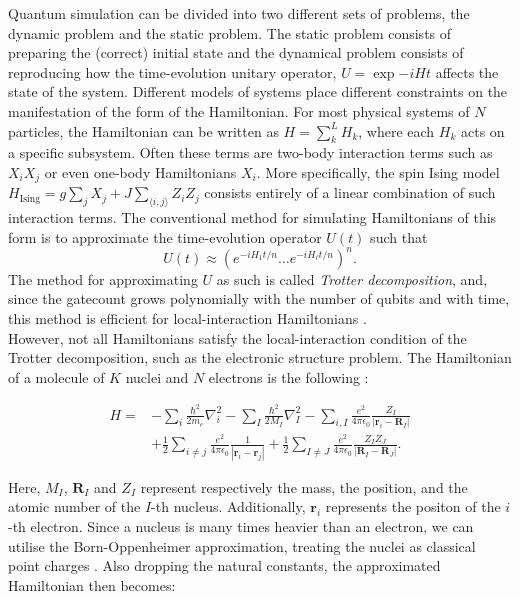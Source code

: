 Quantum simulation can be divided into two different sets of problems, the dynamic problem and the static problem. The static problem consists of preparing the (correct) initial state and the dynamical problem consists of reproducing how the time-evolution unitary operator, $U= \exp{-iHt}$ affects the state of the system. Different models of systems place different constraints on the manifestation of the form of the Hamiltonian. For most physical systems of $N$ particles, the Hamiltonian can be written as
$H = \sum_k^L H_k$, where each $H_k$ acts on a specific subsystem. Often these terms are two-body interaction terms such as $X_i X_j$ or even one-body Hamiltonians $X_i$. More specifically, the spin Ising model $
H_{\mathrm{Ising}}=g \sum_{j} X_{j}+J \sum_{\langle i, j\rangle} Z_{i} Z_j
$ consists entirely of a linear combination of such interaction terms. The conventional method for simulating Hamiltonians of this form is to approximate the time-evolution operator $U(t)$ such that  $$U(t) \approx\left(e^{-i H_{1} t / n} \ldots e^{-i H_{\ell} t / n}\right)^{n}.$$ The method for approximating $U$ as such is called \textit{Trotter decomposition}, and, since the gatecount grows polynomially with the number of qubits and with time, this method is efficient for
local-interaction Hamiltonians \cite{cao}. \\
However, not all Hamiltonians satisfy the local-interaction condition of the Trotter decomposition, such as the electronic structure problem. The Hamiltonian of a molecule of $K$ nuclei and $N$ electrons is the following \cite{McArdle}:

$$
\begin{aligned}
H=&-\sum_{i} \frac{\hbar^{2}}{2 m_{e}} \nabla_{i}^{2}-\sum_{I} \frac{\hbar^{2}}{2 M_{I}} \nabla_{I}^{2}-\sum_{i, I} \frac{e^{2}}{4 \pi \epsilon_{0}} \frac{Z_{I}}{\left|\mathbf{r}_{i}-\mathbf{R}_{I}\right|} \\
&+\frac{1}{2} \sum_{i \neq j} \frac{e^{2}}{4 \pi \epsilon_{0}} \frac{1}{\left|\mathbf{r}_{i}-\mathbf{r}_{j}\right|}+\frac{1}{2} \sum_{I \neq J} \frac{e^{2}}{4 \pi \epsilon_{0}} \frac{Z_{I} Z_{J}}{\left|\mathbf{R}_{I}-\mathbf{R}_{J}\right|}.
\end{aligned}
$$

Here, $M_I$, $\mathbf{R}_{I}$  and $Z_I$ represent respectively the mass, the position, and the atomic number of the $I$-th nucleus. Additionally, $\mathbf{r}_{i}$ represents the positon of the $i$-th electron. Since a nucleus is many times heavier than an electron, we can utilise the Born-Oppenheimer approximation, treating the nuclei as classical point charges \cite{McArdle}. Also dropping the natural constants, the approximated Hamiltonian then becomes:

